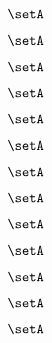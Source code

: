 \begin{forslides}
    \begin{equation}
        \label{eq:slides-processes-96}
        \setA
    \end{equation}

    \begin{equation}
        \label{eq:slides-processes-97}
        \setA
    \end{equation}

    \begin{equation}
        \label{eq:slides-processes-98}
        \setA
    \end{equation}

    \begin{equation}
        \label{eq:slides-processes-99}
        \setA
    \end{equation}

    \begin{equation}
        \label{eq:slides-processes-100}
        \setA
    \end{equation}

    \begin{equation}
        \label{eq:slides-processes-111}
        \setA
    \end{equation}

    \begin{equation}
        \label{eq:slides-processes-112}
        \setA
    \end{equation}

    \begin{equation}
        \label{eq:slides-processes-113}
        \setA
    \end{equation}

    \begin{equation}
        \label{eq:slides-processes-114}
        \setA
    \end{equation}

    \begin{equation}
        \label{eq:slides-processes-115}
        \setA
    \end{equation}

    \begin{equation}
        \label{eq:slides-processes-116}
        \setA
    \end{equation}

    \begin{equation}
        \label{eq:slides-processes-117}
        \setA
    \end{equation}

    \begin{equation}
        \label{eq:slides-processes-118}
        \setA
    \end{equation}


\end{forslides}
